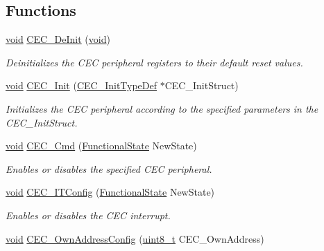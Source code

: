 \subsection*{Functions}
\begin{DoxyCompactItemize}
\item 
\hyperlink{usb__devapi_8h_afabf60e7f57651d6d595a02c75f07cd0}{void} \hyperlink{group___c_e_c___exported___functions_ga604c3b15b51a46303c201fa3deac2212}{C\+E\+C\+\_\+\+De\+Init} (\hyperlink{usb__devapi_8h_afabf60e7f57651d6d595a02c75f07cd0}{void})
\begin{DoxyCompactList}\small\item\em Deinitializes the C\+EC peripheral registers to their default reset values. \end{DoxyCompactList}\item 
\hyperlink{usb__devapi_8h_afabf60e7f57651d6d595a02c75f07cd0}{void} \hyperlink{group___c_e_c___exported___functions_gaf48aee745a16370372b3eaa7cf3ed22b}{C\+E\+C\+\_\+\+Init} (\hyperlink{struct_c_e_c___init_type_def}{C\+E\+C\+\_\+\+Init\+Type\+Def} $\ast$C\+E\+C\+\_\+\+Init\+Struct)
\begin{DoxyCompactList}\small\item\em Initializes the C\+EC peripheral according to the specified parameters in the C\+E\+C\+\_\+\+Init\+Struct. \end{DoxyCompactList}\item 
\hyperlink{usb__devapi_8h_afabf60e7f57651d6d595a02c75f07cd0}{void} \hyperlink{group___c_e_c___exported___functions_ga0c8efa79e5768930e567b3b3ed6e09e9}{C\+E\+C\+\_\+\+Cmd} (\hyperlink{agilefox_2library_2inc_2stm32f10x__type_8h_ac9a7e9a35d2513ec15c3b537aaa4fba1}{Functional\+State} New\+State)
\begin{DoxyCompactList}\small\item\em Enables or disables the specified C\+EC peripheral. \end{DoxyCompactList}\item 
\hyperlink{usb__devapi_8h_afabf60e7f57651d6d595a02c75f07cd0}{void} \hyperlink{group___c_e_c___exported___functions_ga8be87c514505cf82eb29334f054fc0bc}{C\+E\+C\+\_\+\+I\+T\+Config} (\hyperlink{agilefox_2library_2inc_2stm32f10x__type_8h_ac9a7e9a35d2513ec15c3b537aaa4fba1}{Functional\+State} New\+State)
\begin{DoxyCompactList}\small\item\em Enables or disables the C\+EC interrupt. \end{DoxyCompactList}\item 
\hyperlink{usb__devapi_8h_afabf60e7f57651d6d595a02c75f07cd0}{void} \hyperlink{group___c_e_c___exported___functions_gacad422ef1f50246b2021b41835b8a95c}{C\+E\+C\+\_\+\+Own\+Address\+Config} (\hyperlink{_p_e___types_8h_aba7bc1797add20fe3efdf37ced1182c5}{uint8\+\_\+t} C\+E\+C\+\_\+\+Own\+Address)

\end{DoxyCompactItemize}
